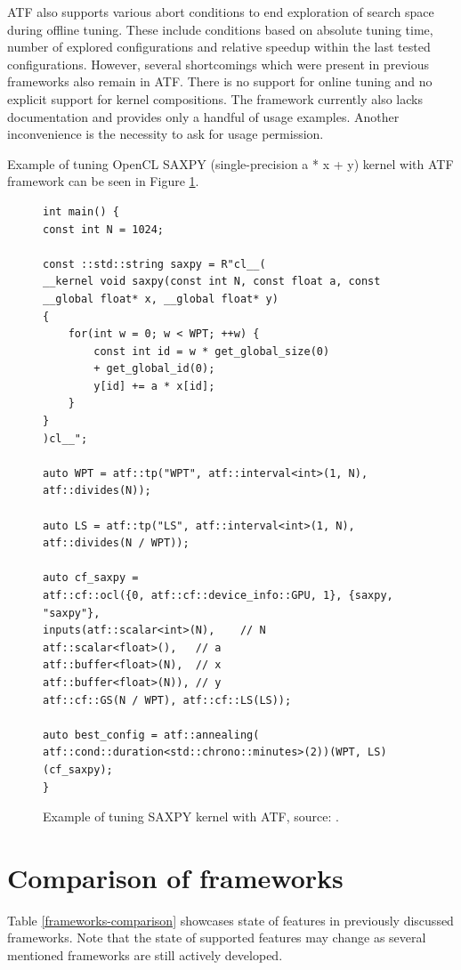 \documentclass
[
    digital, %
    oneside, %
    table, %
    nolof, %
    nolot, %
    nocover %
]{fithesis3}
\begin{document}
ATF also supports various abort conditions to end exploration of search space during offline tuning. These include conditions based on absolute tuning
time, number of explored configurations and relative speedup within the last tested configurations. However, several shortcomings which were present
in previous frameworks also remain in ATF. There is no support for online tuning and no explicit support for kernel compositions. The framework currently
also lacks documentation and provides only a handful of usage examples. Another inconvenience is the necessity to ask for usage permission.

Example of tuning OpenCL SAXPY (single-precision a * x + y) kernel with ATF framework can be seen in Figure \ref{atf-example}.

\begin{figure}
\begin{adjustwidth}{-1cm}{-1cm}
\begin{lstlisting}
int main() {
const int N = 1024;

const ::std::string saxpy = R"cl__( 
__kernel void saxpy(const int N, const float a, const __global float* x, __global float* y)
{       
    for(int w = 0; w < WPT; ++w) {
        const int id = w * get_global_size(0) 
        + get_global_id(0);
        y[id] += a * x[id];
    }
}
)cl__";

auto WPT = atf::tp("WPT", atf::interval<int>(1, N), atf::divides(N));

auto LS = atf::tp("LS", atf::interval<int>(1, N), atf::divides(N / WPT));

auto cf_saxpy =
atf::cf::ocl({0, atf::cf::device_info::GPU, 1}, {saxpy, "saxpy"},
inputs(atf::scalar<int>(N),    // N
atf::scalar<float>(),   // a
atf::buffer<float>(N),  // x
atf::buffer<float>(N)), // y
atf::cf::GS(N / WPT), atf::cf::LS(LS));

auto best_config = atf::annealing(
atf::cond::duration<std::chrono::minutes>(2))(WPT, LS)(cf_saxpy);
}
\end{lstlisting}
\caption{Example of tuning SAXPY kernel with ATF, source: \cite{atf-example}.}
\label{atf-example}
\end{adjustwidth}
\end{figure}

\section{Comparison of frameworks}
Table \ref{frameworks-comparison} showcases state of features in previously discussed frameworks. Note that the state of supported features may change
as several mentioned frameworks are still actively developed.
\end{document}
